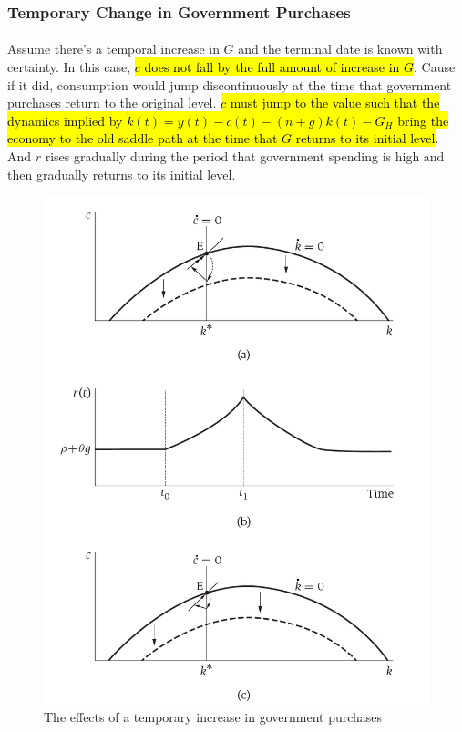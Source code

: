 \documentclass[11pt]{article}
\begin{document}
			\subsubsection{Temporary Change in Government Purchases}
			\paragraph{} Assume there's a temporal increase in $G$ and the terminal date is known with certainty. In this case, \hl{$c$ does not fall by the full amount of increase in $G$}. Cause if it did, consumption would jump discontinuously at the time that government purchases return to the original level. \hl{$c$ must jump to the value such that the dynamics implied by $\dot{k}(t) = y(t) - c(t) - (n+g)k(t) - G_H$ bring the economy to the old saddle path at the time that $G$ returns to its initial level}. And $r$ rises gradually during the period that government spending is high and then gradually returns to its initial level.
				\begin{figure}[h]
					\centering
					\includegraphics[width=0.7\linewidth]{figures/8_1}
					\caption{The effects of a temporary increase in government purchases}
				\end{figure}
\end{document}
